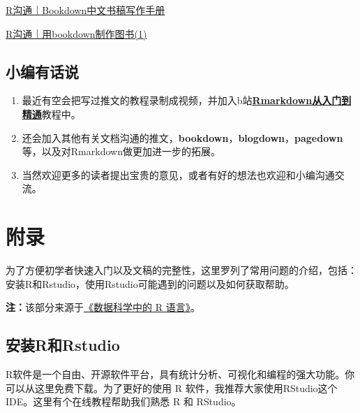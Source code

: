 \documentclass[
]{book}
\providecommand{\tightlist}{%
  \setlength{\itemsep}{0pt}\setlength{\parskip}{0pt}}
\begin{document}
\href{https://zll-blog.netlify.app/2021/07/bookdown_tutoral/}{R沟通｜Bookdown中文书稿写作手册}

\href{http://mp.weixin.qq.com/s?__biz=MzI1NjUwMjQxMQ==\&mid=2247492971\&idx=1\&sn=b342777e1f1bf1d4a85cff0f20735491\&chksm=ea271a8fdd50939996772ee0a8e3bf1cb1f35b2361ef6c160011074464dc957a421e44cba1fe\&scene=21\#wechat_redirect}{R沟通｜用bookdown制作图书(1)}

\hypertarget{ux5c0fux7f16ux6709ux8bddux8bf4}{%
\section{小编有话说}\label{ux5c0fux7f16ux6709ux8bddux8bf4}}

\begin{enumerate}
\def\labelenumi{\arabic{enumi}.}
\tightlist
\item
  最近有空会把写过推文的教程录制成视频，并加入b站\href{https://www.bilibili.com/video/BV1ib4y1X7r9/}{\textbf{Rmarkdown从入门到精通}}教程中。
\item
  还会加入其他有关文档沟通的推文，\textbf{bookdown}，\textbf{blogdown}，\textbf{pagedown}等，以及对Rmarkdown做更加进一步的拓展。
\item
  当然欢迎更多的读者提出宝贵的意见，或者有好的想法也欢迎和小编沟通交流。
\end{enumerate}

\hypertarget{appendix}{%
\chapter{附录}\label{appendix}}

为了方便初学者快速入门以及文稿的完整性，这里罗列了常用问题的介绍，包括：安装R和Rstudio，使用Rstudio可能遇到的问题以及如何获取帮助。

\textbf{注：}该部分来源于\href{https://bookdown.org/wangminjie/R4DS/intro-R.html\#\%E5\%A6\%82\%E4\%BD\%95\%E8\%8E\%B7\%E5\%8F\%96\%E5\%B8\%AE\%E5\%8A\%A9}{《数据科学中的 R 语言》}。

\hypertarget{ux5b89ux88c5rux548crstudio}{%
\section*{安装R和Rstudio}\label{ux5b89ux88c5rux548crstudio}}

R软件是一个自由、开源软件平台，具有统计分析、可视化和编程的强大功能。你可以从这里免费下载。为了更好的使用 R 软件，我推荐大家使用RStudio这个IDE。这里有个在线教程帮助我们熟悉 R 和 RStudio。
\end{document}
